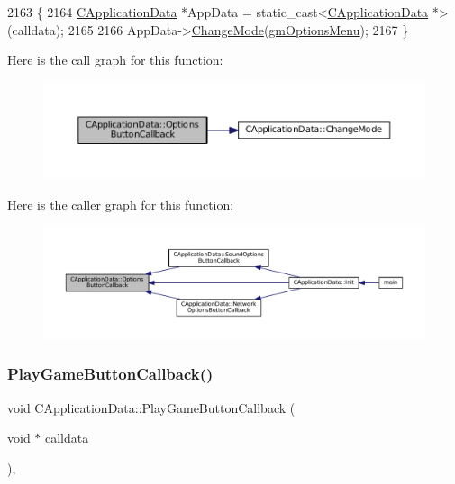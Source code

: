 \begin{DoxyCode}
2163                                                           \{
2164     \hyperlink{classCApplicationData}{CApplicationData} *AppData = \textcolor{keyword}{static\_cast<}\hyperlink{classCApplicationData}{CApplicationData} *\textcolor{keyword}{>}(calldata);
2165                   
2166     AppData->\hyperlink{classCApplicationData_aee18c113e9a0acb3cad3d63eb19de71b}{ChangeMode}(\hyperlink{classCApplicationData_ac8ac37a4c8bb871036fbbdc6a072e403a81d2e5abad73eae4325b5ee0cc69fa3e}{gmOptionsMenu});
2167 \}
\end{DoxyCode}
Here is the call graph for this function\+:\nopagebreak
\begin{figure}[H]
\begin{center}
\leavevmode
\includegraphics[width=350pt]{classCApplicationData_a3647cf78eb59689b901d4204c81555b4_cgraph}
\end{center}
\end{figure}
Here is the caller graph for this function\+:\nopagebreak
\begin{figure}[H]
\begin{center}
\leavevmode
\includegraphics[width=350pt]{classCApplicationData_a3647cf78eb59689b901d4204c81555b4_icgraph}
\end{center}
\end{figure}
\hypertarget{classCApplicationData_a659aa43022e92610c2f8cc182eab1b8e}{}\label{classCApplicationData_a659aa43022e92610c2f8cc182eab1b8e} 
\subsubsection{\texorpdfstring{Play\+Game\+Button\+Callback()}{PlayGameButtonCallback()}}
{\footnotesize\ttfamily void C\+Application\+Data\+::\+Play\+Game\+Button\+Callback (\begin{DoxyParamCaption}\item[{void $\ast$}]{calldata }\end{DoxyParamCaption})\hspace{0.3cm}{\ttfamily [static]}, {\ttfamily [protected]}}



